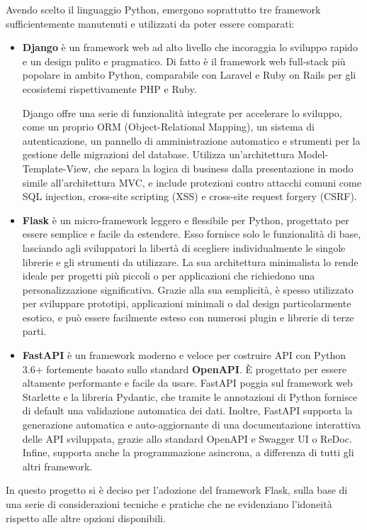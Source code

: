 Avendo scelto il linguaggio Python, emergono soprattutto tre framework sufficientemente manutenuti e utilizzati da poter essere comparati:
\begin{itemize}
    \item \textbf{Django} è un framework web ad alto livello che incoraggia lo sviluppo rapido e un design pulito e pragmatico. Di fatto è il framework web full-stack più popolare in ambito Python, comparabile con Laravel e Ruby on Rails per gli ecosistemi rispettivamente PHP e Ruby.
    
    Django offre una serie di funzionalità integrate per accelerare lo sviluppo, come un proprio ORM (Object-Relational Mapping), un sistema di autenticazione, un pannello di amministrazione automatico e strumenti per la gestione delle migrazioni del database. Utilizza un'architettura Model-Template-View, che separa la logica di business dalla presentazione in modo simile all'architettura MVC, e include protezioni contro attacchi comuni come SQL injection, cross-site scripting (XSS) e cross-site request forgery (CSRF).
    \item \textbf{Flask} è un micro-framework leggero e flessibile per Python, progettato per essere semplice e facile da estendere. Esso fornisce solo le funzionalità di base, lasciando agli sviluppatori la libertà di scegliere individualmente le singole librerie e gli strumenti da utilizzare. La sua architettura minimalista lo rende ideale per progetti più piccoli o per applicazioni che richiedono una personalizzazione significativa. Grazie alla sua semplicità, è spesso utilizzato per sviluppare prototipi, applicazioni minimali o dal design particolarmente esotico, e può essere facilmente esteso con numerosi plugin e librerie di terze parti.
    \item \textbf{FastAPI} è un framework moderno e veloce per costruire API con Python 3.6+ fortemente basato sullo standard \textbf{OpenAPI}. È progettato per essere altamente performante e facile da usare. FastAPI poggia sul framework web Starlette e la libreria Pydantic, che tramite le annotazioni di Python fornisce di default una validazione automatica dei dati. Inoltre, FastAPI supporta la generazione automatica e auto-aggiornante di una documentazione interattiva delle API sviluppata, grazie allo standard OpenAPI e Swagger UI o ReDoc. Infine, supporta anche la programmazione asincrona, a differenza di tutti gli altri framework.
\end{itemize}
In questo progetto si è deciso per l'adozione del framework Flask, sulla base di una serie di considerazioni tecniche e pratiche che ne evidenziano l'idoneità rispetto alle altre opzioni disponibili.

